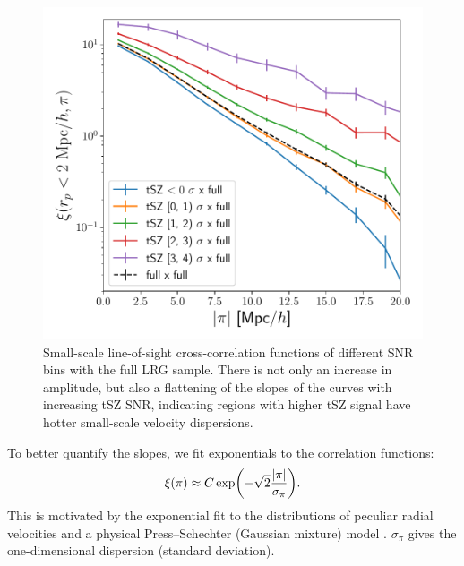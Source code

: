 \begin{figure}[hbtp]
    \centering
    \includegraphics[width=\linewidth]{fig/LRG-z0.4-0.85-SZ-ACTPlanck-filtered2.4-LoS-jack-errorbars.pdf}
    \caption[Small-scale line-of-sight cross-correlation functions of different SNR bins with the full LRG sample]{Small-scale line-of-sight cross-correlation functions of different SNR bins with the full LRG sample.
    There is not only an increase in amplitude, but also a flattening of the slopes of the curves with increasing tSZ SNR, indicating regions with higher tSZ signal have hotter small-scale velocity dispersions.}
    \label{fig:LoS-clustering-SNR-bins}
\end{figure}

To better quantify the slopes, we fit exponentials to the correlation functions:
\begin{equation}
    \xi(\pi) \approx C \exp(-\sqrt{2} \frac{\abs{\pi}}{\sigma_\pi}).
\end{equation}
This is motivated by the exponential fit to the distributions of peculiar radial velocities \citep{Peebles-cosmic-virial-theorem} and a physical Press--Schechter (Gaussian mixture) model \citep{pairwise-peculiar-velocity-distribution-nonlinear}.
$\sigma_\pi$ gives the one-dimensional dispersion (standard deviation).

